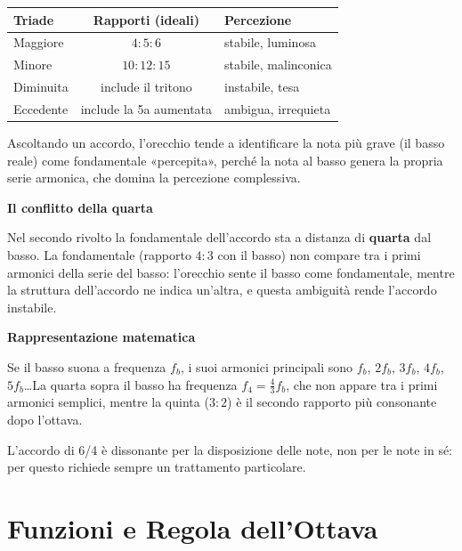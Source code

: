 \begin{fisica}
	\begin{center}
	\begin{tabular}{lcl}
	\toprule
	\textbf{Triade} & \textbf{Rapporti (ideali)} & \textbf{Percezione} \\
	\midrule
	Maggiore & $4:5:6$ & stabile, luminosa \\
	Minore & $10:12:15$ & stabile, malinconica \\
	Diminuita & include il tritono & instabile, tesa \\
	Eccedente & include la 5a aumentata & ambigua, irrequieta \\
	\bottomrule
	\end{tabular}
	\end{center}
\end{fisica}

\begin{fisica}
	\label{phys:conflitto_6_4}

	Ascoltando un accordo, l'orecchio tende a identificare la nota più grave (il basso reale) come fondamentale «percepita», perché la nota al basso genera la propria serie armonica, che domina la percezione complessiva.

	\textbf{Il conflitto della quarta}

	Nel secondo rivolto la fondamentale dell'accordo sta a distanza di \textbf{quarta} dal basso. La fondamentale (rapporto $4:3$ con il basso) non compare tra i primi armonici della serie del basso: l'orecchio sente il basso come fondamentale, mentre la struttura dell'accordo ne indica un'altra, e questa ambiguità rende l'accordo instabile.

	\textbf{Rappresentazione matematica}

	Se il basso suona a frequenza $f_b$, i suoi armonici principali sono $f_b$, $2f_b$, $3f_b$, $4f_b$, $5f_b$\ldots La quarta sopra il basso ha frequenza $f_4 = \frac{4}{3}f_b$, che non appare tra i primi armonici semplici, mentre la quinta ($3:2$) è il secondo rapporto più consonante dopo l'ottava.

	L'accordo di 6/4 è dissonante per la disposizione delle note, non per le note in sé: per questo richiede sempre un trattamento particolare.
\end{fisica}

\section*{Funzioni e Regola dell'Ottava}

